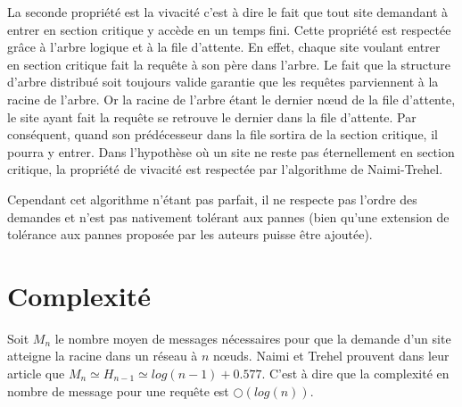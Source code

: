 La seconde propriété est la vivacité c'est à dire le fait que tout site demandant à entrer en
section critique y accède en un temps fini. Cette propriété est respectée grâce à l'arbre logique et à la file d'attente. En effet, chaque site voulant entrer en section critique fait la requête à son père dans l'arbre. Le fait que la structure d'arbre distribué soit toujours valide garantie que les requêtes parviennent à la racine de l'arbre. Or la racine de l'arbre étant le dernier nœud de la file d'attente, le site ayant fait la requête se retrouve le dernier dans la file d'attente. Par conséquent, quand son prédécesseur dans la file sortira de la section critique, il pourra y entrer. Dans l'hypothèse où un site ne reste pas éternellement en section critique, la propriété de vivacité est respectée par l'algorithme de Naimi-Trehel.

Cependant cet algorithme n'étant pas parfait, il ne respecte pas l'ordre des demandes et n'est pas nativement tolérant aux pannes (bien qu'une extension de tolérance aux pannes \cite{naimi1988} proposée par les auteurs puisse être ajoutée).


\section{Complexité}
Soit $M_n$ le nombre moyen de messages nécessaires pour que la demande d'un site atteigne la racine dans un réseau à $n$ nœuds. Naimi et Trehel prouvent dans leur article \cite{naimi1996} que $M_n \simeq H_{n-1} \simeq log(n-1) + 0.577$. C'est à dire que la complexité en nombre de message pour une requête est $\bigcirc(log(n))$.


